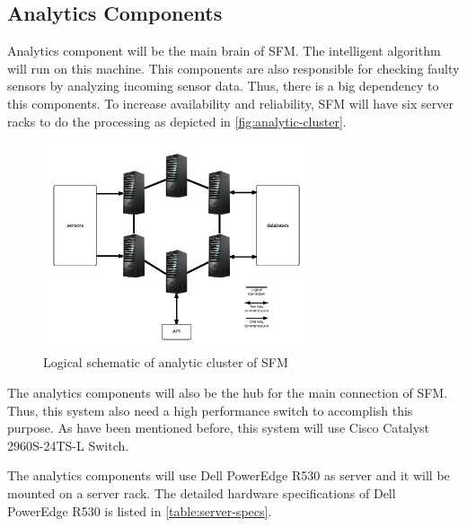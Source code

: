 


\subsection{Analytics Components}
\label{subsec:analytics}
Analytics component will be the main brain of SFM. The intelligent algorithm will run on this machine. This components are also responsible for checking faulty sensors by analyzing incoming sensor data. Thus, there is a big dependency to this components. To increase availability and reliability, SFM will have six server racks to do the processing as depicted in \autoref{fig:analytic-cluster}.

\begin{figure}[H]
\centering
\includegraphics[width=0.7\textwidth]{6-hardware/images/analytic-cluster.png}
\caption{Logical schematic of analytic cluster of SFM}
\label{fig:analytic-cluster}
\end{figure}

The analytics components will also be the hub for the main connection of SFM. Thus, this system also need a high performance switch to accomplish this purpose. As have been mentioned before, this system will use Cisco Catalyst 2960S-24TS-L Switch.

The analytics components will use Dell PowerEdge R530 as server and it will be mounted on a server rack. The detailed hardware specifications of Dell PowerEdge R530 is listed in \autoref{table:server-specs}.
